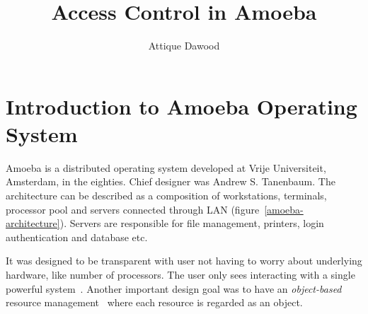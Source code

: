 \documentclass[11pt,a4paper]{article}
\begin{document}
\title{Access Control in Amoeba}
\author{Attique Dawood}
\maketitle

\section{Introduction to Amoeba Operating System}

Amoeba is a distributed operating system developed at Vrije Universiteit, Amsterdam, in the eighties. Chief designer was Andrew S. Tanenbaum. The architecture can be described as a composition of workstations, terminals, processor pool and servers connected through LAN (figure~\ref{amoeba-architecture}). Servers are responsible for file management, printers, login authentication and database etc.

It was designed to be transparent with user not having to worry about underlying hardware, like number of processors. The user only sees interacting with a single powerful system~\cite{amoeba-sourceforge}. Another important design goal was to have an \emph{object-based} resource management~\cite{distributed-systems-coulouris} where each resource is regarded as an object.
\end{document}
